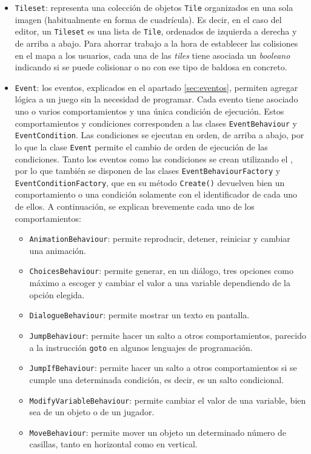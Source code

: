 \begin{itemize}
	\item \texttt{Tileset}: representa una colección de objetos \texttt{Tile} organizados en una sola imagen (habitualmente en forma de cuadrícula). Es decir, en el caso del editor, un \texttt{Tileset} es una lista de \texttt{Tile}, ordenados de izquierda a derecha y de arriba a abajo. Para ahorrar trabajo a la hora de establecer las colisiones en el mapa a los usuarios, cada una de las \textit{tiles} tiene asociada un \textit{booleano} indicando si se puede colisionar o no con ese tipo de baldosa en concreto.
	\item \texttt{Event}: los eventos, explicados en el apartado \ref{sec:eventos}, permiten agregar lógica a un juego sin la necesidad de programar. Cada evento tiene asociado uno o varios comportamientos y una única condición de ejecución. Estos comportamientos y condiciones corresponden a las clases \texttt{EventBehaviour} y \texttt{EventCondition}. Las condiciones se ejecutan en orden, de arriba a abajo, por lo que la clase \texttt{Event} permite el cambio de orden de ejecución de las condiciones. Tanto los eventos como las condiciones se crean utilizando el , por lo que también se disponen de las clases \texttt{EventBehaviourFactory} y \texttt{EventConditionFactory}, que en su método \texttt{Create()} devuelven bien un comportamiento o una condición solamente con el identificador de cada uno de ellos. A continuación, se explican brevemente cada uno de los comportamientos:
	\begin{itemize}
		\item \texttt{AnimationBehaviour}: permite reproducir, detener, reiniciar y cambiar una animación.
		\item \texttt{ChoicesBehaviour}: permite generar, en un diálogo, tres opciones como máximo a escoger y cambiar el valor a una variable dependiendo de la opción elegida.
		\item \texttt{DialogueBehaviour}: permite mostrar un texto en pantalla.
		\item \texttt{JumpBehaviour}: permite hacer un salto a otros comportamientos, parecido a la instrucción \texttt{goto} en algunos lenguajes de programación.
		\item \texttt{JumpIfBehaviour}: permite hacer un salto a otros comportamientos si se cumple una determinada condición, es decir, es un salto condicional.
		\item \texttt{ModifyVariableBehaviour}: permite cambiar el valor de una variable, bien sea de un objeto o de un jugador.
		\item \texttt{MoveBehaviour}: permite mover un objeto un determinado número de casillas, tanto en horizontal como en vertical.

\end{itemize}
\end{itemize}
